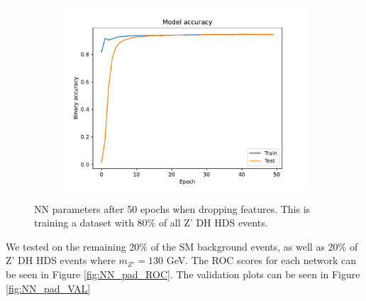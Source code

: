 \documentclass[12pt, a4paper]{book}
\begin{document}
\begin{figure}[!ht]
\begin{subfigure}[b]{0.49\textwidth}
      \includegraphics[width=1\textwidth]{No_pad/Binary_accuracy.pdf}
   \end{subfigure}
   \caption[NN parameters after 50 epochs when dropping features]{NN parameters after 50 epochs when dropping features.  This is training a dataset with 80\% of all Z' DH HDS events.}\label{fig:NN_stats_no_pad}
\end{figure}
\clearpage\noindent We tested on the remaining 20\% of the SM background events, as well as 20\% of Z' DH HDS events where $m_{Z'} =130$ GeV. The ROC scores for each network can be seen in Figure \ref{fig:NN_pad_ROC}. The validation plots can be seen in Figure \ref{fig:NN_pad_VAL}
\end{document}
